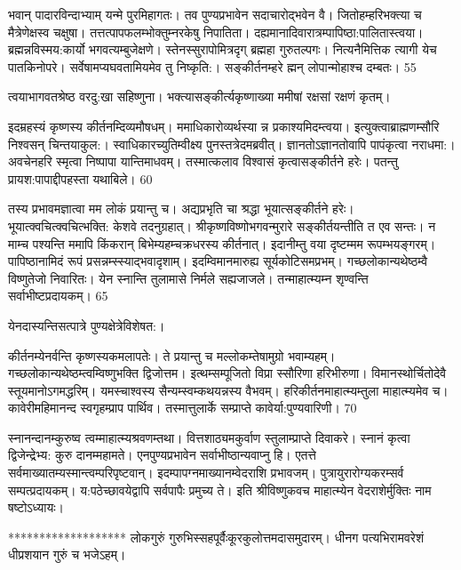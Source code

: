   भवान् पादारविन्दाभ्याम् यन्मे पुरमिहागतः।
 तव पुण्यप्रभावेन सदाचारोद्भवेन वै।
 जितोहम्हरिभक्त्या च मैत्रेणेक्षस्व चक्षुषा।
 तत्तत्पापफलम्भोक्तुम्नरकेषु निपातिता।
 दह्यमानादिवारात्रम्पापिष्ठा:पालितास्त्वया।
 ब्रह्मन्नविस्मय:कार्यो भगवत्यम्बुजेक्षणे।
 स्तेनस्सुरापोमित्रदृग् ब्रह्महा गुरुतल्पगः।
 नित्यनैमित्तिक त्यागी येच पातकिनोपरे।
 सर्वेषामप्यघवतामियमेव तु निष्कृति:।
 सङ्कीर्तनम्हरे ह्मन् लोपान्मोहाश्च दम्बतः।
 55

  त्वयाभागवतश्रेष्ठ वरदु:खा सहिष्णुना।
 भक्त्यासङ्कीर्त्यकृष्णाख्या ममीषां रक्षसां रक्षणं कृतम्।
 
इदम्रहस्यं कृष्णस्य कीर्तनम्दिव्यमौषधम्।
 ममाधिकारोव्यर्थस्या न्न प्रकाश्यमिदम्त्वया।
 इत्युक्त्वाब्राह्मणम्सौरि निश्वसन् चिन्तयाकुल:।
 स्वाधिकारच्युतिम्वीक्ष्य पुनस्तत्रेदमब्रवीत्।
 ज्ञानतोऽज्ञानतोवापि पापंकृत्वा नराधमा:।
 अवचेनहरि स्मृत्वा निष्पापा यान्तिमाधवम्।
 तस्मात्कलाव विश्वासं कृत्वासङ्कीर्तने हरेः।
 पतन्तु प्रायश:पापाद्दीपहस्ता यथाबिले।
 60

  तस्य प्रभावमज्ञात्वा मम लोकं प्रयान्तु च।
 अद्यप्रभृति चा श्रद्धा भूयात्सङ्कीर्तने हरेः।
 भूयात्क्वचित्क्वचित्भक्ति: केशवे तदनुग्रहात्।
 श्रीकृष्णविष्णोभगवन्मुरारे
सङ्कीर्तयन्तीति त एव सन्तः।
 न माम्च पश्यन्ति ममापि
किंकरान् बिभेम्यहम्चक्रधरस्य कीर्तनात्।
 इदानीम्तु वया दृष्टम्मम रूपम्भयङ्गरम्।
 पापिष्ठानामिदं रूपं प्रसन्नम्स्स्याद्भवादृशाम्।
 इदम्विमानमारुह्य सूर्यकोटिसमप्रभम्।
 गच्छलोकान्यथेष्ठम्वै विष्णुतेजो निवारितः।
 येन स्नान्ति तुलामासे निर्मले सह्यजाजले।
 तन्माहात्म्यम्न शृण्वन्ति सर्वाभीष्टप्रदायकम्।
 65

  येनदास्यन्तिसत्पात्रे पुण्यक्षेत्रेविशेषत:।
 
कीर्तनम्येनर्वन्ति कृष्णस्यकमलापतेः।
 ते प्रयान्तु च मल्लोकम्तेषामुग्रो भवाम्यहम्।
 गच्छलोकान्यथेष्ठम्त्वम्विष्णुभक्ति द्विजोत्तम।
 इत्थम्सम्पूजितो विप्रा स्सौरिणा हरिभीरुणा।
 विमानस्थोर्चितोदेवै स्तूयमानोऽगमद्धरिम्।
 यमस्चाश्वस्य सैन्यम्स्वम्कथयन्नस्य वैभवम्।
 हरिकीर्तनमाहात्म्यम्तुला माहात्म्यमेव च।
 कावेरीमहिमानन्द स्वगृहम्प्राप पार्थिव।
 तस्मात्तुलार्के सम्प्राप्ते कावेर्या:पुण्यवारिणी।
 70

  स्नानन्दानम्कुरुष्व त्वम्माहात्म्यश्रवणम्तथा।
 वित्तशाठ्यमकुर्वाण स्तुलाम्प्राप्ते दिवाकरे।
 स्नानं कृत्वा द्विजेन्द्रेभ्य: कुरु दानम्महामते।
 एनपुण्यप्रभावेन सर्वाभीष्ठान्यवाप्नु हि।
 एतत्ते सर्वमाख्यातम्यस्मान्त्वम्परिपृष्टवान्।
 इदम्पापग्नमाख्यानम्वेदराशि प्रभावजम्।
 पुत्रायुरारोग्यकरम्सर्व सम्पत्प्रदायकम्।
 य:पठेच्छावयेद्वापि सर्वपापैः प्रमुच्य ते।
 इति श्रीविष्णुकवच माहात्म्येन वेदराशेर्मुक्तिः नाम
षष्टोऽध्यायः।

*******************
लोकगुरुं गुरुभिस्सहपूर्वैःकूरकुलोत्तमदासमुदारम्।
 धीनग पत्यभिरामवरेशं धीप्रशयान गुरुं च भजेऽहम्।
 
